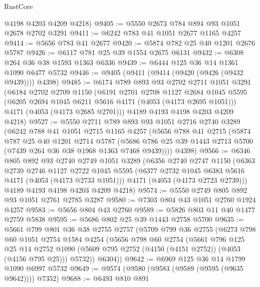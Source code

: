\begin{lexlean}{RustCore}
\begin{coremodule}
      @4198
      @4203
      @4209
      @4218)
@9405 := @5550 @2673 @784 @894 @93 @1051 @2678 @2702 @3291
@9411 := @6242 @783 @41 @1051 @2677 @1165 @4257
@9414 := @5656 @783 @41 @2677
@9420 := @5874 @782 @25 @40 @1201 @2676 @5787
@9426 := @6117 @781 @25 @39 @1554 @2675 @6131
@9432 := @6308 @264 @36 @38 @1593 @1363 @6336
@9439 := @6444 @125 @36 @14 @1361 @1090 @6477 @5732
@9446 := @9405 (@9411 (@9414 (@9420 (@9426 (@9432 @9439)))) @4398)
@9485 := @6174
    @789
    @893
    @93
    @2702
    @2711
    @1051
    @3291
    (@6184
      @2702
      @2709
      @1150
      (@6191
        @2701
        @2708
        @1127
        @2684
        @1045
        @5595
        (@6205 @2694 @1045 @6211 @5616 @4171 (@4053 (@4173 @2695 @1051)))
        @4171
        (@4053 (@4173 @2685 @2701)))
      @4189
      @4193
      @4198
      @4203
      @4209
      @4218)
@9527 := @5550
    @2711
    @789
    @893
    @93
    @1051
    @2716
    @2740
    @3289
    (@6242
      @788
      @41
      @1051
      @2715
      @1165
      @4257
      (@5656
        @788
        @41
        @2715
        (@5874
          @787
          @25
          @40
          @1201
          @2714
          @5787
          (@5686 @786 @25 @39 @1443 @2713 @5700 (@7439 @264 @36 @38 @1968 @1363 @7468 @9439))))
      @4398)
@9566 := @6346
    @805
    @892
    @93
    @2740
    @2749
    @1051
    @3289
    (@6356
      @2740
      @2747
      @1150
      (@6363
        @2739
        @2746
        @1127
        @2722
        @1045
        @5595
        (@6377 @2732 @1045 @6383 @5616 @4171 (@4053 (@4173 @2733 @1051)))
        @4171
        (@4053 (@4173 @2723 @2739)))
      @4189
      @4193
      @4198
      @4203
      @4209
      @4218)
@9574 := @5550 @2749 @805 @892 @93 @1051 @2761 @2785 @3287
@9580 := @7303 @804 @43 @1051 @2760 @1924 @4257
@9583 := @5656 @804 @43 @2760
@9589 := @5826 @803 @11 @40 @1477 @2759 @5838
@9595 := @5686 @802 @25 @39 @1443 @2758 @5700
@9635 := @5661
    @799
    @801
    @36
    @38
    @2755
    @2757
    (@5709
      @799
      @36
      @2755
      (@6273
        @798
        @60
        @1051
        @2754
        @1584
        @4254
        (@5656
          @798
          @60
          @2754
          (@5661
            @796
            @125
            @25
            @14
            @2752
            @1090
            (@5609 @795 @2752 (@4150 (@4151 @2752)) (@4053 (@4156 @795 @25)))
            @5732))
        @6304))
@9642 := @6969 @125 @36 @14 @1799 @1090 @6997 @5732
@9649 := @9574 (@9580 (@9583 (@9589 (@9595 (@9635 @9642)))) @7352)
@9688 := @6493
    @810
    @891

\end{coremodule}
\end{lexlean}
